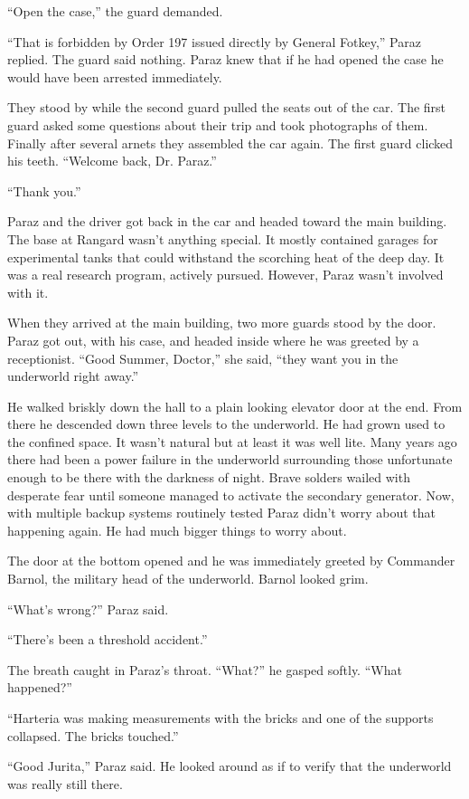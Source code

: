 ``Open the case,'' the guard demanded.

``That is forbidden by Order 197 issued directly by General Fotkey,'' Paraz replied. The guard
said nothing. Paraz knew that if he had opened the case he would have been arrested immediately.

They stood by while the second guard pulled the seats out of the car. The first guard asked some
questions about their trip and took photographs of them. Finally after several arnets they
assembled the car again. The first guard clicked his teeth. ``Welcome back, Dr. Paraz.''

``Thank you.''

Paraz and the driver got back in the car and headed toward the main building. The base at
Rangard wasn't anything special. It mostly contained garages for experimental tanks that could
withstand the scorching heat of the deep day. It was a real research program, actively pursued.
However, Paraz wasn't involved with it.

When they arrived at the main building, two more guards stood by the door. Paraz got out, with
his case, and headed inside where he was greeted by a receptionist. ``Good Summer, Doctor,'' she
said, ``they want you in the underworld right away.''

He walked briskly down the hall to a plain looking elevator door at the end. From there he
descended down three levels to the underworld. He had grown used to the confined space. It
wasn't natural but at least it was well lite. Many years ago there had been a power failure in
the underworld surrounding those unfortunate enough to be there with the darkness of night.
Brave solders wailed with desperate fear until someone managed to activate the secondary
generator. Now, with multiple backup systems routinely tested Paraz didn't worry about that
happening again. He had much bigger things to worry about.

The door at the bottom opened and he was immediately greeted by Commander Barnol, the military
head of the underworld. Barnol looked grim.

``What's wrong?'' Paraz said.

``There's been a threshold accident.''

The breath caught in Paraz's throat. ``What?'' he gasped softly. ``What happened?''

``Harteria was making measurements with the bricks and one of the supports collapsed. The bricks
touched.''

``Good Jurita,'' Paraz said. He looked around as if to verify that the underworld was really
still there.

